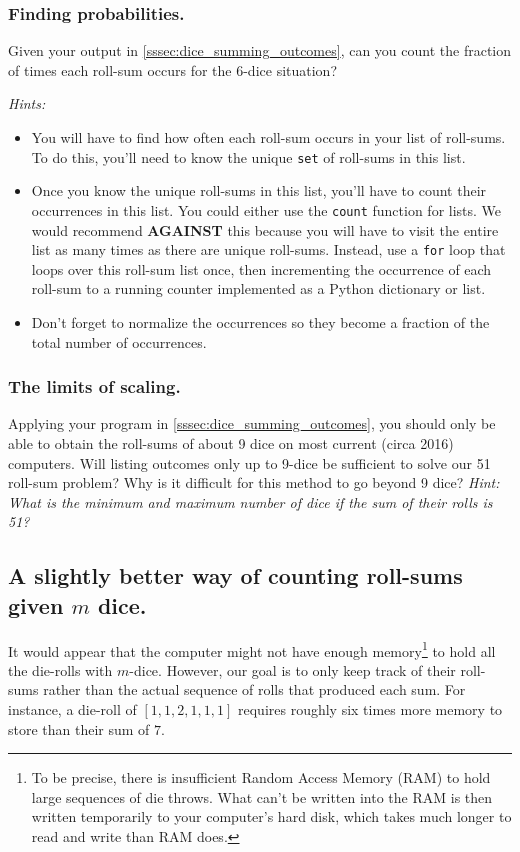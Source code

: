 \documentclass[11pt, oneside]{article}   	%
\begin{document}
\subsubsection{Finding probabilities.} \label{sssec:dice_counting_probabilities}
Given your output in \ref{sssec:dice_summing_outcomes}, can you count the fraction of times each roll-sum occurs for the 6-dice situation? 

{\it 
Hints:
\begin{itemize}
\item{} You will have to find how often each roll-sum occurs in your list of roll-sums. To do this, you'll need to know the unique {\tt set} of roll-sums in this list.
\item{} Once you know the unique roll-sums in this list, you'll have to count their occurrences in this list. You could either use the {\tt count} function for lists. We would recommend {\bf AGAINST} this because you will have to visit the entire list as many times as there are unique roll-sums. Instead, use a {\tt for} loop that loops over this roll-sum list once, then incrementing the occurrence of each roll-sum to a running counter implemented as a Python dictionary or list.  
\item{} Don't forget to normalize the occurrences so they become a fraction of the total number of occurrences.
\end{itemize}
}

\subsubsection{The limits of scaling.}
Applying your program in \ref{sssec:dice_summing_outcomes}, you should only be able to obtain the roll-sums of about 9 dice on most current (circa 2016) computers. Will listing outcomes only up to 9-dice be sufficient to solve our 51 roll-sum problem? Why is it difficult for this method to go beyond 9 dice? {\it Hint: What is the minimum and maximum number of dice if the sum of their rolls is 51?}

\subsection{A slightly better way of counting roll-sums given $m$ dice.}
It would appear that the computer might not have enough memory\footnote{To be precise, there is insufficient Random Access Memory (RAM) to hold large sequences of die throws. What can't be written into the RAM is then written temporarily to your computer's hard disk, which takes much longer to read and write than RAM does.} to hold all the die-rolls with $m$-dice. However, our goal is to only keep track of their roll-sums rather than the actual sequence of rolls that produced each sum. For instance, a die-roll of $[1,1,2,1,1,1]$ requires roughly six times more memory to store than their sum of $7$. 
\end{document}
